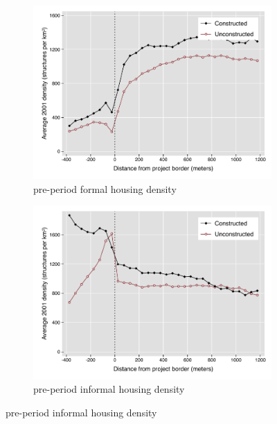 \documentclass[12pt]{article}
\begin{document}
\begin{figure}[h!]
        \centering
        \caption[ Pre-Period Housing Densities in Constructed and Unconstructed Projects Areas ]
        {\small Pre-Period Housing Densities in Constructed and Unconstructed projects } 
        \begin{subfigure}[b]{0.495\textwidth}
            \centering
            \includegraphics[width=\textwidth,trim={0.3cm .3cm 0.1cm 0cm}, clip=true]{figures/bblu_for_pre_means_5.pdf}
            \caption[Network2]%
            {{\small pre-period formal housing density}}    
            \label{fig:prefor}
        \end{subfigure}
        \hfill
        \begin{subfigure}[b]{0.495\textwidth}  
            \centering 
            \includegraphics[width=\textwidth,trim={0.3cm .3cm 0.1cm 0cm}, clip=true]{figures/bblu_inf_pre_means_5.pdf}
            \caption[]%
            {{\small pre-period informal housing density}}    
            \label{fig:preinf}
        \end{subfigure}
        \label{fig:rawbblumeans}
        \vspace{-6mm}
    \end{figure} 
\end{document}
